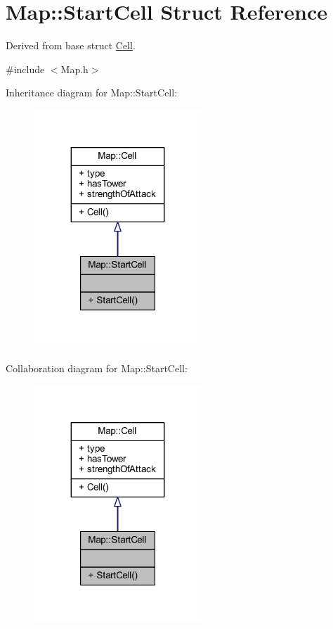 \hypertarget{struct_map_1_1_start_cell}{\section{Map\+:\+:Start\+Cell Struct Reference}
\label{struct_map_1_1_start_cell}
}


Derived from base struct \hyperlink{struct_map_1_1_cell}{Cell}.  




{\ttfamily \#include $<$Map.\+h$>$}



Inheritance diagram for Map\+:\+:Start\+Cell\+:
\nopagebreak
\begin{figure}[H]
\begin{center}
\leavevmode
\includegraphics[width=179pt]{struct_map_1_1_start_cell__inherit__graph}
\end{center}
\end{figure}


Collaboration diagram for Map\+:\+:Start\+Cell\+:
\nopagebreak
\begin{figure}[H]
\begin{center}
\leavevmode
\includegraphics[width=179pt]{struct_map_1_1_start_cell__coll__graph}
\end{center}
\end{figure}

